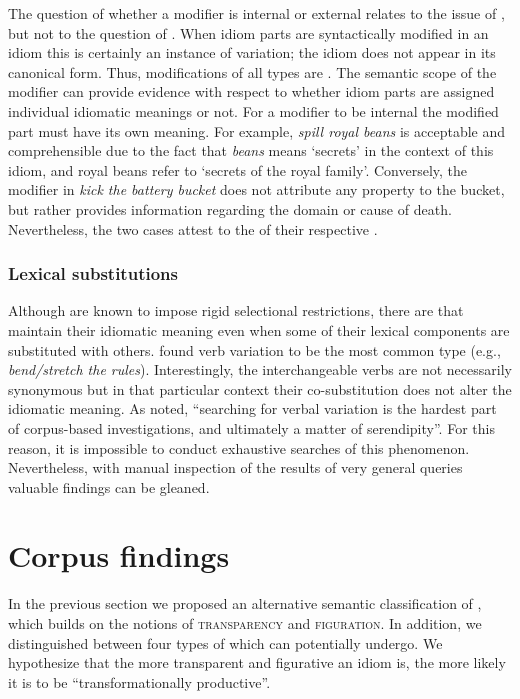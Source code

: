 \documentclass[output=paper]{langsci/langscibook}
\begin{document}
\eal
\zl

The question of whether a modifier is internal or external relates to the issue of , but not to the question of . When idiom parts are syntactically modified in an idiom this is certainly an instance of variation; the idiom does not appear in its canonical form. Thus, modifications of all types are . The semantic scope of the modifier can provide evidence with respect to whether idiom parts are assigned individual idiomatic meanings or not. For a modifier to be internal the modified part must have its own meaning. For example, \textit{spill royal beans} is acceptable and comprehensible due to the fact that \textit{beans} means `secrets' in the context of this idiom, and royal beans refer to `secrets of the royal family'. Conversely, the modifier in \textit{kick the battery bucket} does not attribute any property to the bucket, but rather provides information regarding the domain or cause of death. Nevertheless, the two cases attest to the  of their respective .


\subsubsection{Lexical substitutions}

Although  are known to impose rigid selectional restrictions, there are  that maintain their idiomatic meaning even when some of their lexical components are substituted with others. \citet{moon98} found verb variation to be the most
common type (e.g., \textit{bend\slash stretch the rules}). Interestingly, the interchangeable verbs are not necessarily synonymous but in that particular context their co-substitution does not alter the idiomatic meaning. As \citet[50]{moon98} noted, ``searching for verbal variation is the hardest part of corpus-based investigations, and ultimately a matter of serendipity''. For this reason, it is impossible to conduct exhaustive searches of this phenomenon. Nevertheless, with manual inspection of the results of very general queries valuable findings can be gleaned.


\section{Corpus findings}
In the previous section we proposed an alternative semantic classification of , which builds on the notions of {\scshape transparency} and {\scshape figuration}. In addition, we distinguished between four types of  which  can potentially undergo.
We hypothesize that the more transparent and figurative an idiom is, the more likely it is to be ``transformationally productive''.
\end{document}
